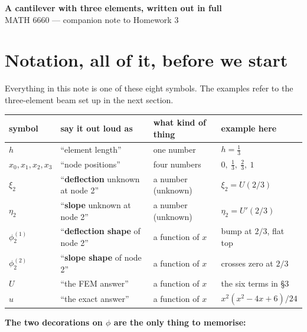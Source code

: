 \documentclass[11pt]{article}
\begin{document}
\begin{center}
  {\large\bfseries A cantilever with three elements, written out in full}\\[3pt]
  {\small MATH 6660 --- companion note to Homework 3}
\end{center}

\vspace{2pt}

\section*{Notation, all of it, before we start}

Everything in this note is one of these eight symbols.  The examples refer to
the three-element beam set up in the next section.

\begin{center}\small
\renewcommand{\arraystretch}{1.35}
\begin{tabular}{@{}llll@{}}
\toprule
symbol & say it out loud as & what kind of thing & example here\\
\midrule
$h$ & ``element length'' & one number & $h=\tfrac13$\\
$x_{0},x_{1},x_{2},x_{3}$ & ``node positions'' & four numbers & $0,\ \tfrac13,\ \tfrac23,\ 1$\\[2pt]
\midrule
$\xi_{2}$ & ``\textbf{deflection} unknown at node 2'' & a number (unknown) & $\xi_{2}=U(2/3)$\\
$\eta_{2}$ & ``\textbf{slope} unknown at node 2'' & a number (unknown) & $\eta_{2}=U'(2/3)$\\[2pt]
\midrule
$\phi^{(1)}_{2}$ & ``\textbf{deflection shape} of node 2'' & a function of $x$ & bump at $2/3$, flat top\\
$\phi^{(2)}_{2}$ & ``\textbf{slope shape} of node 2'' & a function of $x$ & crosses zero at $2/3$\\[2pt]
\midrule
$U$ & ``the FEM answer'' & a function of $x$ & the six terms in \S3\\
$u$ & ``the exact answer'' & a function of $x$ & $x^{2}(x^{2}-4x+6)/24$\\
\bottomrule
\end{tabular}
\end{center}

\textbf{The two decorations on $\phi$ are the only thing to memorise:}

\begin{center}
\end{center}
\end{document}
